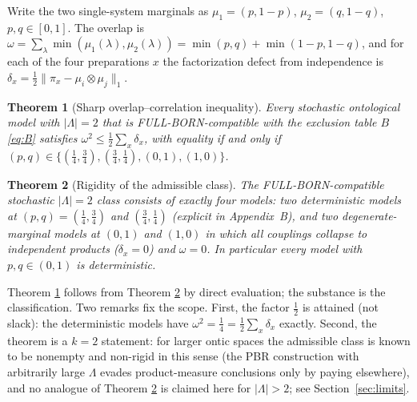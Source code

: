 \documentclass[11pt,a4paper]{article}
\newtheorem{theorem}{Theorem}
\newcommand{\dd}{\delta}
\begin{document}
Write the two single-system marginals as $\mu_1=(p,1-p)$, $\mu_2=(q,1-q)$, $p,q\in[0,1]$. The overlap is $\omega=\sum_{\lambda}\min(\mu_1(\lambda),\mu_2(\lambda)) = \min(p,q)+\min(1-p,1-q)$, and for each of the four preparations $x$ the factorization defect from independence is $\dd_x=\tfrac12\|\pi_x-\mu_i\otimes\mu_j\|_1$.

\begin{theorem}[Sharp overlap--correlation inequality]
\label{thm:main}
Every stochastic ontological model with $|\Lambda|=2$ that is FULL-BORN-compatible with the exclusion table $B$ \eqref{eq:B} satisfies
$\omega^2 \le \tfrac12\sum_x \dd_x$,
with equality if and only if $(p,q)\in\{(\tfrac14,\tfrac34),(\tfrac34,\tfrac14),(0,1),(1,0)\}$.
\end{theorem}

\begin{theorem}[Rigidity of the admissible class]
\label{thm:rigid}
The FULL-BORN-compatible stochastic $|\Lambda|=2$ class consists of exactly four models: two deterministic models at $(p,q)=(\tfrac14,\tfrac34)$ and $(\tfrac34,\tfrac14)$ (explicit in Appendix~B), and two degenerate-marginal models at $(0,1)$ and $(1,0)$ in which all couplings collapse to independent products ($\dd_x=0$) and $\omega=0$. In particular every model with $p,q\in(0,1)$ is deterministic.
\end{theorem}

Theorem \ref{thm:main} follows from Theorem \ref{thm:rigid} by direct evaluation; the substance is the classification. Two remarks fix the scope. First, the factor $\tfrac12$ is attained (not slack): the deterministic models have $\omega^2=\tfrac14=\tfrac12\sum_x\dd_x$ exactly. Second, the theorem is a $k=2$ statement: for larger ontic spaces the admissible class is known to be nonempty and non-rigid in this sense (the PBR construction with arbitrarily large $\Lambda$ evades product-measure conclusions only by paying elsewhere), and no analogue of Theorem \ref{thm:rigid} is claimed here for $|\Lambda|>2$; see Section~\ref{sec:limits}.
\end{document}
